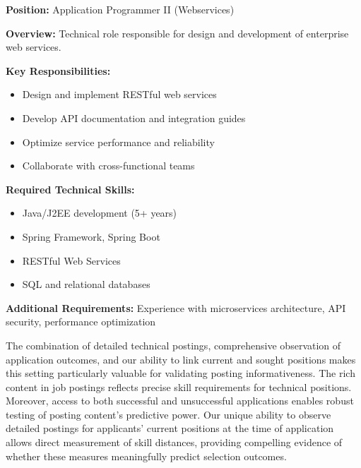 \begin{tcolorbox}[colback=gray!5,colframe=blue!75!black, 
title=Sample Technical Role Description,
label=box:vacancy_posting]
\small
\textbf{Position:} Application Programmer II (Webservices)

\textbf{Overview:} 
Technical role responsible for design and development of enterprise web services.

\textbf{Key Responsibilities:}
\begin{itemize}
\item Design and implement RESTful web services
\item Develop API documentation and integration guides
\item Optimize service performance and reliability
\item Collaborate with cross-functional teams
\end{itemize}

\textbf{Required Technical Skills:}
\begin{itemize}
\item Java/J2EE development (5+ years)
\item Spring Framework, Spring Boot
\item RESTful Web Services
\item SQL and relational databases
\end{itemize}

\textbf{Additional Requirements:}
Experience with microservices architecture, API security, performance optimization
\end{tcolorbox}

The combination of detailed technical postings, comprehensive observation of application outcomes, and our ability 
to link current and sought positions makes this setting particularly valuable for validating posting informativeness. 
The rich content in job postings reflects precise skill requirements for technical positions. Moreover, access to 
both successful and unsuccessful applications enables robust testing of posting content's predictive power. Our 
unique ability to observe detailed postings for applicants' current positions at the time of application allows 
direct measurement of skill distances, providing compelling evidence of whether these measures meaningfully predict 
selection outcomes.